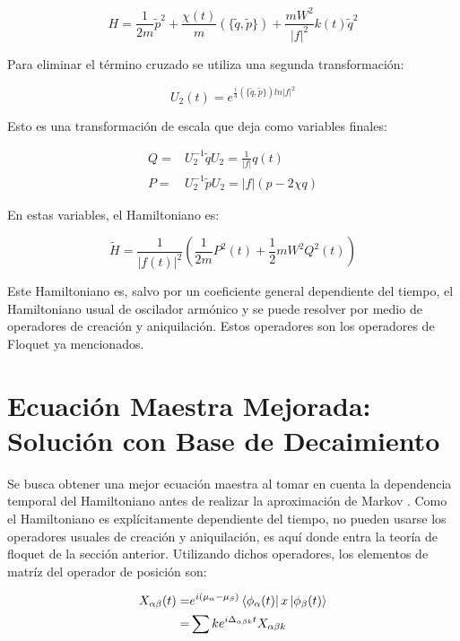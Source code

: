\documentclass[a4paper,10pt]{report}
\begin{document}
\begin{equation}
 H = \frac{1}{2m}\tilde{p}^2 + \frac{\chi(t)}{m}(\{\tilde{q},\tilde{p}\}) + \frac{mW^2}{|f|^2}k(t)\tilde{q}^2
\end{equation}

Para eliminar el término cruzado se utiliza una segunda transformación:

\begin{equation}
U_2(t)=e^{\frac{i}{4}(\{\tilde{q},\tilde{p}\})ln|f|^2}
\end{equation}

Esto es una transformación de escala que deja como variables finales:

\begin{align}
Q=&U_2^{-1}\tilde{q}U_2 =\frac{1}{|f|}q(t)\\
P=&U_2^{-1}\tilde{p}U_2 = |f|(p-2\chi q) 
\end{align}

En estas variables, el Hamiltoniano es:

\begin{equation}\label{QTDHO}
\tilde{H} = \frac{1}{|f(t)|^2}(\frac{1}{2m}P^2(t)+\frac{1}{2}mW^2Q^2(t))
\end{equation}

Este Hamiltoniano es, salvo por un coeficiente general dependiente del tiempo, el Hamiltoniano usual de oscilador armónico y se puede resolver por medio de operadores de creación y aniquilación. Estos operadores son los operadores de Floquet ya mencionados.

\section{Ecuación Maestra Mejorada: Solución con Base de Decaimiento}

Se busca obtener una mejor ecuación maestra al tomar en cuenta la dependencia temporal del Hamiltoniano antes de realizar la aproximación de Markov \cite{HanngiDQS}. Como el Hamiltoniano es explícitamente dependiente del tiempo, no pueden usarse los operadores usuales de creación y aniquilación, es aquí donde entra la teoría de floquet de la sección anterior. Utilizando dichos operadores, los elementos de matríz del operador de posición son:

\begin{align}
X_{\alpha \beta}(t) =& e^{i(\mu_{\alpha}-\mu_{\beta})}\Bra{\phi_{\alpha}(t)}x\Ket{\phi_{\beta}(t)}\\
=& \sum{k} e^{i\Delta_{\alpha\beta k}t} X_{\alpha\beta k}
\end{align}
\end{document}
